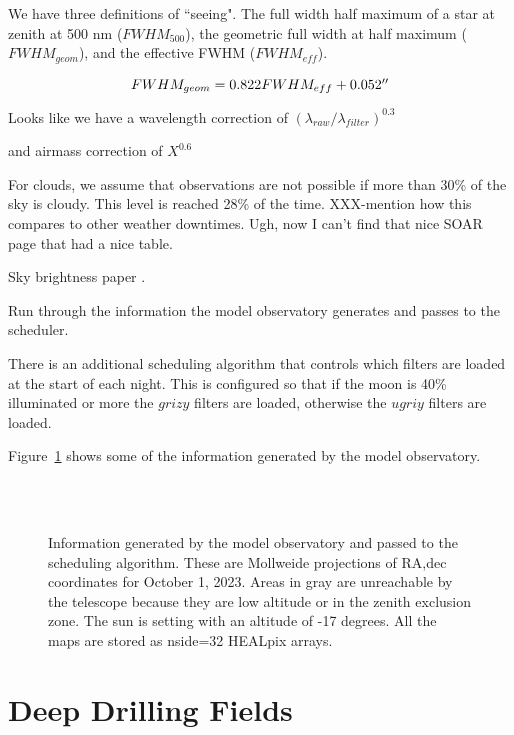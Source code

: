 \documentclass[]{aastex631}
\begin{document}
We have three definitions of ``seeing". The full width half maximum of a star at zenith at 500 nm ($FWHM_{500}$), the geometric full width at half maximum ($FWHM_{geom}$), and the effective FWHM ($FWHM_{eff}$).

\begin{equation}
    FWHM_{geom} = 0.822 FWHM_{eff} + 0.052\arcsec
\end{equation}

Looks like we have a wavelength correction of $(\lambda_{raw}/\lambda_{filter})^{0.3}$

and airmass correction of $X^{0.6}$

For clouds, we assume that observations are not possible if more than 30\% of the sky is cloudy. This level is reached 28\% of the time. XXX-mention how this compares to other weather downtimes. Ugh, now I can't find that nice SOAR page that had a nice table.

Sky brightness paper \citep{Yoachim2016}. 


Run through the information the model observatory generates and passes to the scheduler.

There is an additional scheduling algorithm that controls which filters are loaded at the start of each night. This is configured so that if the moon is 40\% illuminated or more the $grizy$ filters are loaded, otherwise the $ugriy$ filters are loaded.

Figure~\ref{fig:conditions} shows some of the information generated by the model observatory. 

\begin{figure}
     \\
     \\
    \caption{Information generated by the model observatory and passed to the scheduling algorithm. These are Mollweide projections of RA,dec coordinates for October 1, 2023. Areas in gray are unreachable by the telescope because they are low altitude or in the zenith exclusion zone. The sun is setting with an altitude of -17 degrees. All the maps are stored as nside=32 HEALpix arrays. }
    \label{fig:conditions}
\end{figure}


\section{Deep Drilling Fields}
\end{document}
